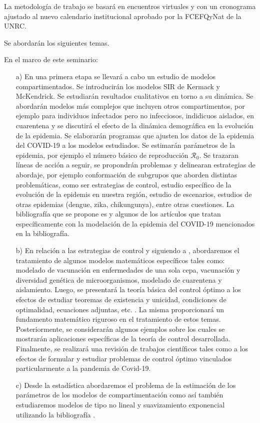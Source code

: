 \documentclass{article}
\begin{document}
La metodología de trabajo se basará en encuentros virtuales y con un cronograma ajustado al nuevo calendario institucional aprobado por la FCEFQyNat de la UNRC.



Se abordarán los siguientes temas. 

En el marco de este seminario:
\begin{itemize}
	\item[a)]   En una primera etapa se llevará  a cabo un estudio de modelos compartimentados. Se introducirán los modelos SIR de Kermack y McKendrick. Se estudiarán resultados cualitativos en torno a su dinámica. Se abordarán modelos más complejos que incluyen otros compartimentos, por ejemplo para individuos infectados pero no infecciosos, indidicuos aislados, en cuarentena y se discutirá el efecto de la dinámica demográfica en la evolución de la epidemia.  Se elaborarán programas que ajusten los datos de la epidemia del COVID-19 a los modelos estudiados. Se estimarán parámetros de la epidemia, por ejemplo el número básico de reproducción $\mathcal{R}_0$. Se trazaran líneas de acción a seguir, se propondrán problemas y delinearan estrategias de abordaje, por ejemplo conformación de subgrupos que aborden distintas problemáticas, como ser estrategias de control, estudio específico de la evolución de la epidemis en nuestra región, estudio de escenarios, estudios de otras epidemias (dengue, zika, chikungunya), entre otras cuestiones. La bibliografía que se propone es \cite{FredBrauer,MaiaMartcheva480,FredBrauer478,FredBrauer479} y algunos de los artículos que tratan específicamente con la modelación de la epidemia del COVID-19 mencionados en la bibliografía.
	
	\item[b)] 
	En relación a las estrategias de control y  siguiendo a \cite{MaiaMartcheva480}, abordaremos el tratamiento de  algunos modelos matemáticos específicos tales como: modelado de vacunación en enfermedades de una sola cepa, vacunación y diversidad genética de microorganismos, modelado de cuarentena y aislamiento. Luego,  se presentará la teoría básica del control óptimo a los efectos de estudiar teoremas de existencia y unicidad, condiciones de optimalidad, ecuaciones adjuntas, etc. \cite{SS,LAH,LW}. La misma proporcionará un fundamento matemático riguroso en el tratamiento de estos temas. Posteriormente, se considerarán algunos ejemplos sobre los cuales se mostrarán aplicaciones específicas de la teoría de control desarrollada. Finalmente, se realizará una revisión de trabajos científicos tales como \cite{ALA,AAC,AGS,BKO,BGO,C,HY,ST,ZKJ} a los efectos de formular y estudiar problemas de control óptimo vinculados particularmente a la pandemia de Covid-19.
	\item[c)] Desde la estadística abordaremos el problema de la estimación de los parámetros de los modelos de compartimentación como así también estudiaremos modelos de tipo   no lineal y suavizamiento exponencial utilizando la bibliografía  
	\cite{AthaHynd, Hyndvarios, KR, JZC, PM,  hyn1, hyn2, fergu2020}. 	\end{itemize} 
 
\end{document}
